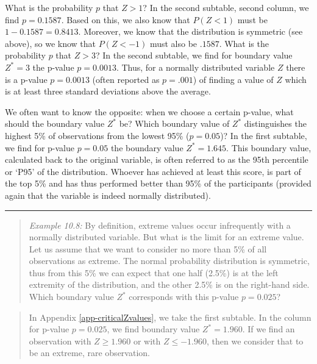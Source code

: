 \documentclass[
]{book}
\begin{document}
What is the probability \(p\) that \(Z>1\)? In the second subtable, second column,
we find \(p=0.1587\). Based on this, we also know that \(P(Z<1)\) must be
\(1-0.1587=0.8413\). Moreover, we know that the distribution is symmetric
(see above), so we know that \(P(Z< -1)\) must also be \(.1587\).
What is the probability \(p\) that \(Z>3\)? In the second subtable, we find
for boundary value \(Z^*=3\) the p-value
\(p=0.0013\). Thus, for a normally distributed variable \(Z\)
there is a p-value \(p=0.0013\) (often reported as \(p=.001\)) of finding a value of \(Z\)
which is at least three standard deviations above the average.

We often want to know the opposite: when we choose a certain p-value,
what should the boundary value \(Z^*\) be?
Which boundary value of \(Z^*\) distinguishes the highest 5\% of observations from the
lowest 95\% (\(p=0.05\))? In the first subtable, we find for p-value
\(p=0.05\) the boundary value \(Z^*=1.645\). This boundary value, calculated back
to the original variable, is often referred to as the 95th percentile or
`P95' of the distribution. Whoever has achieved at least this score,
is part of the top 5\% and has thus performed better than
95\% of the participants
(provided again that the variable is indeed normally distributed).

\begin{center}\rule{0.5\linewidth}{0.5pt}\end{center}

\begin{quote}
\emph{Example 10.8:}
By definition, extreme values occur infrequently with a normally distributed
variable. But what is the limit for an extreme value. Let us assume that
we want to consider no more than 5\% of all observations as extreme.
The normal probability distribution is symmetric, thus from this 5\% we can
expect that one half (2.5\%) is at the left extremity of the distribution,
and the other 2.5\% is on the right-hand side. Which boundary value \(Z^*\)
corresponds with this p-value \(p=0.025\)?
\end{quote}

\begin{quote}
In
Appendix \ref{app-criticalZvalues}, we take the first subtable. In the column
for p-value \(p=0.025\), we find boundary value
\(Z^*=1.960\). If we find an observation with \(Z \ge 1.960\) or with
\(Z \le -1.960\), then we consider that to be an extreme, rare
observation.
\end{quote}
\end{document}

